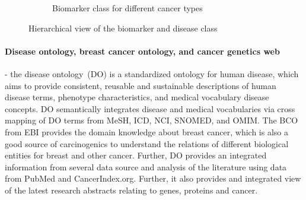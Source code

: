 \begin{figure}[h]
\begin{subfigure}{.48\linewidth}
		\caption{Biomarker class for different cancer types}
        \label{fig:annotations_for_genes}
	\end{subfigure}

	\caption{Hierarchical view of the biomarker and disease class} 
	\label{fig:property_enrich_annotations_for_genes}
	\vspace{-4mm}
\end{figure}

\paragraph{Disease ontology, breast cancer ontology, and cancer genetics web} \hspace*{-2.5mm} - the disease ontology~(DO) is a standardized ontology for human disease, which aims to provide consistent, reusable and sustainable descriptions of human disease terms, phenotype characteristics, and medical vocabulary disease concepts. DO semantically integrates disease and medical vocabularies via cross mapping of DO terms from MeSH, ICD, NCI, SNOMED, and OMIM. The BCO from EBI provides the domain knowledge about breast cancer, which is also a good source of carcinogenics to understand the relations of different biological entities for breast and other cancer. Further, DO provides an integrated information from several data source and analysis of the literature using data from PubMed and CancerIndex.org. Further, it also provides and integrated view of the latest research abstracts relating to genes, proteins and cancer.  

